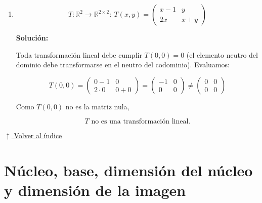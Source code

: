 \documentclass[12pt]{article}
\newcommand{\solucion}{%
    \vspace{0.8em}%
    \textbf{Solución:}%
    \vspace{0.8em}%
}
\newcommand{\volverindice}{%
    \vspace{1em}%
    \begin{flushright}%
        \hyperlink{indice}{\small $\uparrow$ Volver al índice}%
    \end{flushright}%
}
\begin{document}
\begin{enumerate}[label=\alph*.-]
    \[
    =\big[(a+b)x^3+cx^2+dx-b\big]+\big[(a_1+b_1)x^3+c_1x^2+d_1x-b_1\big]
    \]

    \[
    =T(A)+T(A_1)
    \]

    \textbf{Homogeneidad:}

    \[
    T(\alpha A)=T\begin{pmatrix}\alpha a&\alpha b\\\alpha c&\alpha d\end{pmatrix}
    =(\alpha a+\alpha b)x^3+\alpha c x^2+\alpha d x-\alpha b
    =\alpha\big[(a+b)x^3+cx^2+dx-b\big]=\alpha\,T(A)
    \]

    \[
    \boxed{T \text{ es una transformación lineal.}}
    \]


    \item
    \[
    T:\mathbb{R}^2\to\mathbb{R}^{2\times2}:\
    T(x,y)=\begin{pmatrix}x-1&y\\2x&x+y\end{pmatrix}
    \]

    \solucion

    Toda transformación lineal debe cumplir $T(0,0)=0$ (el elemento
    neutro del dominio debe transformarse en el neutro del codominio).
    Evaluamos:

    \[
    T(0,0)=\begin{pmatrix}0-1&0\\2\cdot0&0+0\end{pmatrix}
    =\begin{pmatrix}-1&0\\0&0\end{pmatrix}\neq
    \begin{pmatrix}0&0\\0&0\end{pmatrix}
    \]

    Como $T(0,0)$ no es la matriz nula,

    \[
    \boxed{T \text{ no es una transformación lineal.}}
    \]

\end{enumerate}

\volverindice


\section{Núcleo, base, dimensión del núcleo y dimensión de la imagen}
\end{document}
